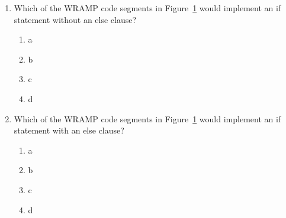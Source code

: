 \documentclass[a4paper,10pt]{article}
\begin{document}
\begin{enumerate}
\begin{figure}[h]
\begin{footnotesize}
\begin{center}
\begin{tabular}{|lp{4cm}|lp{4cm}|}
\hline
(a) &
\begin{verbatim}
       addi $2, $0, 1
label: sgei $4, $2, 4
       bnez $4, label2
       ...
       addi $2, $2, 1
       j    label
label2:
\end{verbatim}

& (b) &

\begin{verbatim}
       addi $2, $0, 1
label: sgti $4, $2, 4
       bnez $4, label2
       ...
       addi $2, $2, 1
       j    label
label2:
\end{verbatim}
\\
\hline
(c) &
       ...
\begin{verbatim}
       slt   $13, $3, $4
       beqz  $13, label
       ...
       j     label2
label:
       ...
label2:
\end{verbatim}
& (d) &
       ...
\begin{verbatim}
       sge   $13, $3, $4
       beqz  $13, label
       ...
label: 
       ...
\end{verbatim}
\\
\hline
\end{tabular}
\end{center}
\end{footnotesize}
\caption{Code for multichoice questions~\ref{ques:multicode}
--~\ref{ques:multicodeend}}
\label{fig:multicode}
\end{figure}

\item 
\label{ques:multicode}
Which of the WRAMP code segments in Figure~\ref{fig:multicode}
would implement an if statement without an else clause?
\begin{enumerate}
  \item a
  \item b
  \item c
  \item d
\end{enumerate}


\item 
Which of the WRAMP code segments in Figure~\ref{fig:multicode}
would implement an if statement with an else clause?
\begin{enumerate}
  \item a
  \item b
  \item c
  \item d
\end{enumerate}


\end{enumerate}
\end{document}
